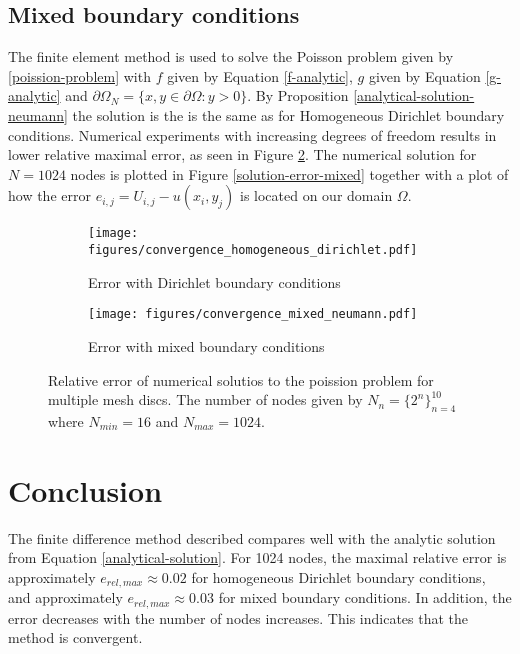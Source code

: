 \documentclass[11pt,a4paper,english]{elsarticle}%
\begin{document}
\subsection{Mixed boundary conditions}
The finite element method is used to solve the Poisson problem given by \eqref{poission-problem} with $f$ given by Equation \eqref{f-analytic}, $g$ given by Equation \eqref{g-analytic} and $\partial \Omega_N = \{ x,y \in \partial \Omega : y> 0\}$. By Proposition \ref{analytical-solution-neumann} the solution is the is the same as for Homogeneous Dirichlet boundary conditions. Numerical experiments with increasing degrees of freedom results in lower relative maximal error, as seen in Figure \ref{convergence-neumann}. The numerical solution for $N = 1024$ nodes is plotted in Figure \ref{solution-error-mixed} together with a plot of how the error $e_{i,j} = U_{i,j} - u(x_i,y_j)$ is located on our domain $\Omega$. 

\begin{figure}[t]
\begin{subfigure}[t]{0.5\linewidth}
        \centering
            \texttt{[image: figures/convergence\_homogeneous\_dirichlet.pdf]}
        \caption{Error with Dirichlet boundary conditions}
        \label{convergence-dirichlet}
    \end{subfigure}\qquad
    \begin{subfigure}[t]{0.5\linewidth}
        \centering
            \texttt{[image: figures/convergence\_mixed\_neumann.pdf]}
        \caption{Error with mixed boundary conditions}
        \label{convergence-neumann}
    \end{subfigure}
    \label{fig-convergence}
    \caption{Relative error of numerical solutios to the poission problem for multiple mesh discs. The number of nodes given by $N_n = \{ 2^n\}_{n=4}^{10}$
    where $N_{min} = 16$ and $N_{max} = 1024$.}
\end{figure}
   
\section{Conclusion}
The finite difference method described compares well with the analytic solution from Equation \eqref{analytical-solution}. For 1024 nodes, the maximal relative error is approximately $e_{rel,max} \approx 0.02$ for homogeneous Dirichlet boundary conditions, and approximately $e_{rel,max} \approx 0.03$ for mixed boundary conditions. In addition, the error decreases with  the number of nodes increases. This indicates that the method is convergent.
	


\end{document}
